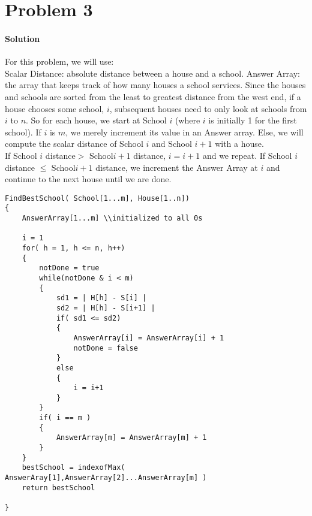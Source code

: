 \documentclass[12pt]{article}
\begin{document}
\section{Problem 3}
\paragraph{Solution}
For this problem, we will use:\\
Scalar Distance: absolute distance between a house and a school.
Answer Array: the array that keeps track of how many houses a school services.
Since the houses and schools are sorted from the least to greatest distance from the west end,
if a house chooses some school, $i$, subsequent houses need to only look at schools from $i$ to $n$.
So for each house, we start at School $i$ (where $i$ is initially 1 for the first school).
If $i$ is $m$, we merely increment its value in an Answer array.
Else, we will compute the scalar distance of School $i$ and School $i+1$ with a house.\\
If School $i$ distance$ > $ School$i+1$ distance, $i = i +1$ and we repeat.
If School $i$ distance $\leq$  School$i+1$ distance, we increment the Answer Array at $i$ and continue to the next house until we are done.

 \begin{lstlisting}
FindBestSchool( School[1...m], House[1..n])
{
	AnswerArray[1...m] \\initialized to all 0s
	
	i = 1
	for( h = 1, h <= n, h++)
	{
		notDone = true
		while(notDone & i < m)
		{
			sd1 = | H[h] - S[i] |
			sd2 = | H[h] - S[i+1] |
			if( sd1 <= sd2)
			{
				AnswerArray[i] = AnswerArray[i] + 1
				notDone = false
			}
			else
			{
				i = i+1
			}
		}
		if( i == m )
		{
			AnswerArray[m] = AnswerArray[m] + 1
		}
	}
	bestSchool = indexofMax( AnswerAray[1],AnswerArray[2]...AnswerArray[m] )
	return bestSchool
	
}
\end{lstlisting}
\end{document}
